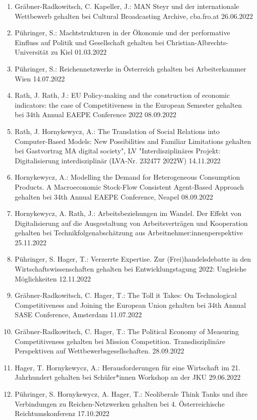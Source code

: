\begin{enumerate}
	\item Gräbner-Radkowitsch, C. Kapeller, J.: MAN Steyr und der internationale Wettbewerb gehalten bei Cultural Broadcasting Archive, cba.fro.at 26.06.2022
	\item Pühringer, S.: Machtstrukturen in der Ökonomie und der performative Einfluss auf Politik und Gesellschaft gehalten bei Christian-Albrechts-Universität zu Kiel 01.03.2022
	\item Pühringer, S.: Reichennetzwerke in Österreich gehalten bei Arbeiterkammer Wien 14.07.2022
	\item Rath, J. Rath, J.: EU Policy-making and the construction of economic indicators: the case of Competitiveness in the European Semester gehalten bei 34th Annual EAEPE Conference 2022 08.09.2022
	\item Rath, J. Hornykewycz, A.: The Translation of Social Relations into Computer-Based Models: New Possibilities and Familiar Limitations gehalten bei Gastvortrag MA \glqq digital society", LV "Interdisziplinäres Projekt: Digitalisierung interdisziplinär\grqq{} (LVA-Nr. 232477 2022W) 14.11.2022
	\item Hornykewycz, A.: Modelling the Demand for Heterogeneous Consumption Products. A Macroeconomic Stock-Flow Consistent Agent-Based Approach gehalten bei 34th Annual EAEPE Conference, Neapel 08.09.2022
	\item Hornykewycz, A. Rath, J.: Arbeitsbeziehungen im Wandel. Der Effekt von Digitalisierung auf die Ausgestaltung von Arbeitsverträgen und Kooperation gehalten bei Technikfolgenabschätzung aus Arbeitnehmer:innenperspektive 25.11.2022
	\item Pühringer, S. Hager, T.: Verzerrte Expertise. Zur (Frei)handelsdebatte in den Wirtschaftswissenschaften gehalten bei Entwicklungstagung 2022: Ungleiche Möglichkeiten 12.11.2022
	\item Gräbner-Radkowitsch, C. Hager, T.: The Toll it Takes: On Technological Competitiveness and Joining the European Union gehalten bei 34th Annual SASE Conference, Amsterdam 11.07.2022
	\item Gräbner-Radkowitsch, C. Hager, T.: The Political Economy of Measuring Competitiveness gehalten bei Mission Competition. Transdisziplinäre Perspektiven auf Wettbewerbsgesellschaften. 28.09.2022
	\item Hager, T. Hornykewycz, A.: Herausforderungen für eine Wirtschaft im 21. Jahrhundert gehalten bei Schüler*innen Workshop an der JKU 29.06.2022
	\item Pühringer, S. Hornykewycz, A. Hager, T.: Neoliberale Think Tanks und ihre Verbindungen zu Reichen-Netzwerken gehalten bei 4. Österreichische Reichtumskonferenz 17.10.2022

\end{enumerate}
